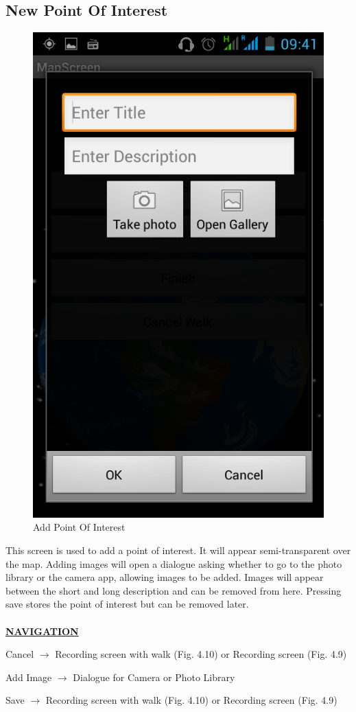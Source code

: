 \documentclass[12pt]{article}
\begin{document}
\subsection{New Point Of Interest}
\begin{figure}[htp]
\centering
\includegraphics[scale=0.4]{Project_Plan/android/add_poi.png}
\caption{Add Point Of Interest}
\label{Add Point Of Interest}
\end{figure}
\par{This screen is used to add a point of interest. It will appear semi-transparent over the map. Adding images will open a dialogue asking whether to go to the photo library or the camera app, allowing images to be added. Images will appear between the short and long description and can be removed from here. Pressing save stores the point of interest but can be removed later. \\ \\}
\textbf{\uline{NAVIGATION}}
\par{Cancel $\rightarrow$ Recording screen with walk (Fig. 4.10) or Recording screen (Fig. 4.9)}
\par{Add Image $\rightarrow$ Dialogue for Camera or Photo Library}
\par{Save $\rightarrow$ Recording screen with walk (Fig. 4.10) or Recording screen (Fig. 4.9)}
\end{document}
